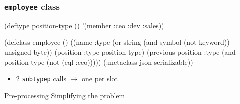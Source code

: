 \documentclass[aspectratio=169]{beamer}
\renewcommand\code[1]{\texttt{#1}}
\newcommand\rarr{\ensuremath{\rightarrow}}
\begin{document}
\begin{frame}[fragile]
  \frametitle{\code{employee} class}
\begin{clcode}
(deftype position-type () '(member :ceo :dev :sales))

(defclass employee ()
  ((name :type (or string
                   (and symbol
                        (not keyword))
                   unsigned-byte))
   (position :type position-type)
   (previous-position :type (and position-type
                                 (not (eql :ceo)))))
  (:metaclass json-serializable))
\end{clcode}

  \pause
  \begin{itemize}
  \item 2 \code{subtypep} calls \rarr{} one per slot
  \end{itemize}
\end{frame}

\begin{sectionframe}{Pre-processing}
  Simplifying the problem
\end{sectionframe}
\end{document}
